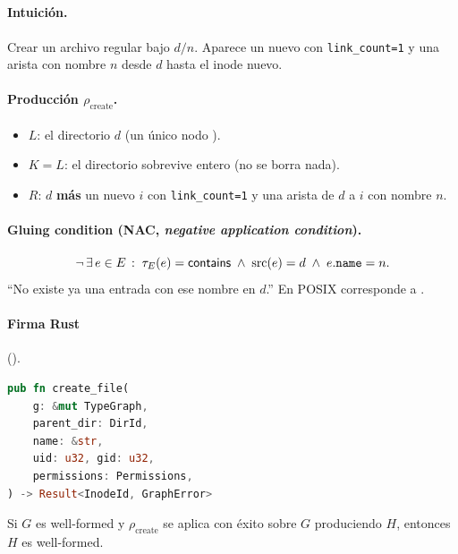 \subsection{\opcreate}

\paragraph{Intuición.} Crear un archivo regular bajo $d/n$. Aparece un
nuevo \NInode{} con \texttt{link\_count=1} y una arista \econtains{} con
nombre $n$ desde $d$ hasta el inode nuevo.

\paragraph{Producción $\rho_{\mathrm{create}}$.}

\begin{itemize}
  \item $L$: el directorio $d$ (un único nodo \NDir).
  \item $K = L$: el directorio sobrevive entero (no se borra nada).
  \item $R$: $d$ \textbf{más} un nuevo \NInode{} $i$ con
    \texttt{link\_count=1} y una arista \econtains{} de $d$ a $i$ con
    nombre $n$.
\end{itemize}

\paragraph{Gluing condition (NAC, \emph{negative application condition}).}
\[
  \neg\,\exists\,e \in E\,:\;
    \tau_E(e) = \textsf{contains} \;\wedge\; \mathrm{src}(e) = d \;\wedge\; e.\texttt{name} = n.
\]
``No existe ya una entrada con ese nombre en $d$.'' En POSIX corresponde
a \eexist.

\paragraph{Firma Rust} ().

\begin{lstlisting}[language=rust]
pub fn create_file(
    g: &mut TypeGraph,
    parent_dir: DirId,
    name: &str,
    uid: u32, gid: u32,
    permissions: Permissions,
) -> Result<InodeId, GraphError>
\end{lstlisting}

\begin{lema}
\label{lem:create-preserva}
Si $G$ es well-formed y $\rho_{\mathrm{create}}$ se aplica con éxito
sobre $G$ produciendo $H$, entonces $H$ es well-formed.
\end{lema}

